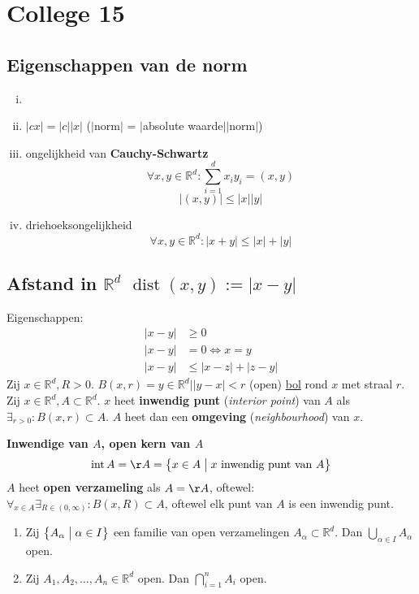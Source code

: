 \documentclass[a4paper]{exam}
\theoremstyle{definition}
\DeclareMathOperator{\intr}{int}
\DeclareMathOperator{\dist}{dist}
\begin{document}
\section{College 15}
    \subsection{Eigenschappen van de norm}
    \begin{enumerate}[(i)]
      \item {}
      \item $|cx|=|c||x|$ ($|$norm$|$ = $|$absolute waarde$||$norm$|$)
      \item ongelijkheid van \textbf{Cauchy-Schwartz}
        \[\forall x,y \in \mathbb{R}^d: \sum_{i=1}^{d}x_i y_i = (x,y)\]
        \[|(x,y)| \leq |x||y|\]
      \item driehoeksongelijkheid
        \[\forall x,y \in \mathbb{R}^d: |x+y|\leq |x|+|y|\]
    \end{enumerate}
    \subsection{Afstand in $\mathbb{R}^d$ $\dist(x,y):=|x-y|$}
        Eigenschappen:
            \begin{align*}
              |x-y| & \geq 0 \\
              |x-y| & =0 \Leftrightarrow x=y \\
              |x-y| & \leq |x-z| + |z-y|
            \end{align*}
         Zij $x \in \mathbb{R}^d, R>0$.
              $B(x,r)={y \in \mathbb{R}^d | |y-x|<r }$ (open) \underline{bol} rond $x$ met straal $r$.
		 Zij $x \in \mathbb{R}^d, A \subset \mathbb{R}^d$. $x$ heet \textbf{inwendig punt} (\textit{interior point}) van $A$ als $\exists _{r>0}:B(x,r) \subset A$. $A$ heet dan een \textbf{omgeving} (\textit{neighbourhood}) van $x$.

              \textbf{Inwendige van $A$, open kern van $A$}
              \[\intr A=\AA=\big\{x \in A \bigm| x \text{ inwendig punt van } A\big\}\]
              $A$ heet \textbf{open verzameling} als $A=\AA$, oftewel: $\forall _{x \in A} \exists _{R \in (0,\infty)}: B(x,R) \subset A$, oftewel elk punt van $A$ is een inwendig punt.
        \theorem
          \begin{enumerate}[(1)]
                \item Zij $\big\{A_\alpha \bigm| \alpha \in I \big\}$ een familie van open verzamelingen $A_\alpha \subset \mathbb{R}^d$. Dan $\bigcup_{\alpha \in I}A_\alpha$ open.
                \item Zij $A_1,A_2,\dots,A_n \in \mathbb{R}^d$ open. Dan $\bigcap_{i=1}^{n}A_i$ open.
          \end{enumerate}
\end{document}
